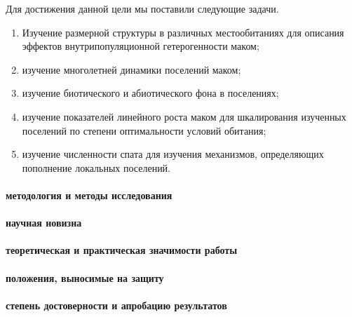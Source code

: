 Для достижения данной цели мы поставили следующие задачи.
  \begin{enumerate}
    \item Изучение размерной %
структуры в различных местообитаниях для описания эффектов внутрипопуляционной гетерогенности маком;
    \item изучение многолетней динамики поселений маком;
    \item изучение биотического и абиотического фона в поселениях;
    \item изучение показателей линейного роста маком для шкалирования изученных поселений по степени оптимальности условий обитания;
    \item изучение численности спата для изучения механизмов, определяющих пополнение локальных поселений.
  \end{enumerate}

\paragraph{методология и методы исследования}

\paragraph{научная новизна}

\paragraph{теоретическая и практическая значимости работы}

\paragraph{положения, выносимые на защиту}

\paragraph{степень достоверности и апробацию результатов}




